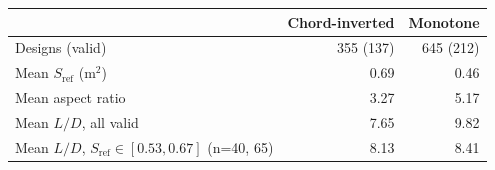 \begin{tabular}{@{}lrr@{}}
\toprule
 & Chord-inverted & Monotone \\
\midrule
Designs (valid) & 355 (137) & 645 (212) \\
Mean $S_\mathrm{ref}$ (m$^2$) & 0.69 & 0.46 \\
Mean aspect ratio & 3.27 & 5.17 \\
Mean $L/D$, all valid & 7.65 & 9.82 \\
Mean $L/D$, $S_\mathrm{ref}\in[0.53,0.67]$ (n=40, 65) & 8.13 & 8.41 \\
\bottomrule
\end{tabular}
